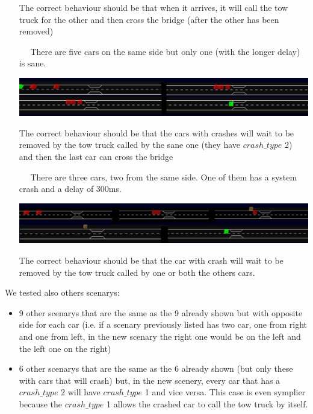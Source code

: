 \begin{itemize}
    The correct behaviour should be that when it arrives, it will call the tow truck for
    the other and then cross the bridge (after the other has been removed) \\

   \item[\fbox{scenery \textbf{8}} $\quad$] There are five cars on the same side but only one (with the longer delay) is sane. \\
  
   \begin{center}
        \includegraphics[scale=0.3, width=\linewidth]{assets/sc8.jpg}
    \end{center} 

    The correct behaviour should be that the cars with crashes will wait to be removed by the tow truck called 
    by the sane one (they have $crash\_type$ 2) and then the last car can cross the bridge \\

    \item[\fbox{scenery \textbf{9}} $\quad$] There are three cars, two from the same side. One of them has a system crash 
    and a delay of 300ms. \\

    \begin{center}
        \includegraphics[scale=0.3, width=\linewidth]{assets/sc10.jpg}
    \end{center}

    The correct behaviour should be that the car with crash will wait to be removed by the tow truck called by
    one or both the others cars.\\
\end{itemize}

We tested also others scenarys:
\begin{itemize}
    \item 9 other scenarys that are the same as the 9 already shown but with opposite side for each car (i.e. 
    if a scenary previously listed has two car, one from right and one from left, in the new scenary the right one
    would be on the left and the left one on the right)
    \item 6 other scenarys that are the same as the 6 already shown (but only these with cars that will crash) 
    but, in the new scenery, every car that has a $crash\_type$ 2 will have $crash\_type$ 1 and vice versa. This case
    is even symplier because the $crash\_type$ 1 allows the crashed car to call the tow truck by itself.
\end{itemize}
